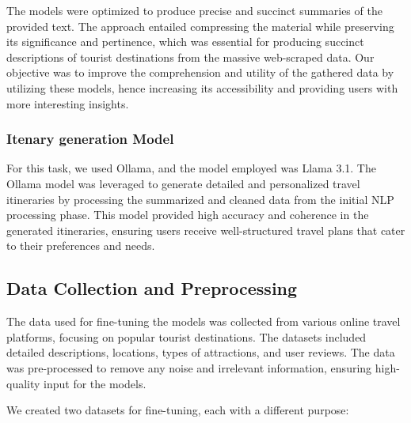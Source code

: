 \documentclass[conference]{IEEEtran}
\begin{document}
            The models were optimized to produce precise and succinct summaries of the provided text. The approach entailed compressing the material while preserving its significance and pertinence, which was essential for producing succinct descriptions of tourist destinations from the massive web-scraped data.
            Our objective was to improve the comprehension and utility of the gathered data by utilizing these models, hence increasing its accessibility and providing users with more interesting insights.

         \subsubsection{Itenary generation Model}
            For this task, we used Ollama, and the model employed was Llama 3.1. The Ollama model was leveraged to generate detailed and personalized travel itineraries by processing the summarized and cleaned data from the initial NLP processing phase. This model provided high accuracy and coherence in the generated itineraries, ensuring users receive well-structured travel plans that cater to their preferences and needs.

    \subsection{Data Collection and Preprocessing}

        The data used for fine-tuning the models was collected from various online travel platforms, focusing on popular tourist destinations. The datasets included detailed descriptions, locations, types of attractions, and user reviews. The data was pre-processed to remove any noise and irrelevant information, ensuring high-quality input for the models.

        We created two datasets for fine-tuning, each with a different purpose:
\end{document}
